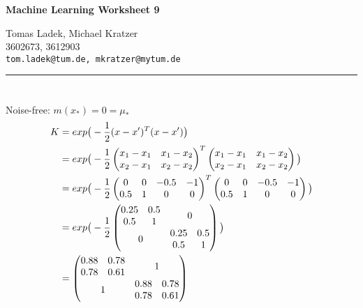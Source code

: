 \documentclass[11pt]{article}
\makeatletter
\newcommand{\exercise}{\section{}}
\newcommand{\hwhead}[4]{
\begin{center}
\sffamily\large\bfseries Machine Learning Worksheet #1
\vspace{2mm}
\normalfont

#2\\
#3\\
\texttt{#4}
\end{center}
\vspace{6mm} \hrule \vspace{4mm}
}
\newcommand{\names}{Tomas Ladek, Michael Kratzer} %
\newcommand{\imats}{3602673, 3612903} %
\newcommand{\emails}{tom.ladek@tum.de, mkratzer@mytum.de} %
\makeatother
\begin{document}
\hwhead{9}{\names}{\imats}{\emails}


\exercise
Noise-free: $m(x_*) = 0 = \mu_*$
\begin{align*}
	K &= exp\big(-\dfrac{1}{2}(x - x')^T (x - x')\big)\\	
	  &= exp\big(-\dfrac{1}{2}
	  \begin{pmatrix}
		  x_1 - x_1 & x_1 - x_2 \\
		  x_2 - x_1 & x_2 - x_2
	  \end{pmatrix}^T 
	  \begin{pmatrix}
		  x_1 - x_1 & x_1 - x_2 \\
		  x_2 - x_1 & x_2 - x_2
	  \end{pmatrix}
	  \big)\\	  
	  &= exp\big(-\dfrac{1}{2}
	  \begin{pmatrix}
		  0 & 0 & -0.5 & -1 \\
		  0.5 & 1 & 0 & 0
	  \end{pmatrix}^T 
	  \begin{pmatrix}
		  0 & 0 & -0.5 & -1 \\
		  0.5 & 1 & 0 & 0
	  \end{pmatrix}
	  \big)\\	  
	  &= exp\big(-\dfrac{1}{2}
	  \begin{pmatrix}
		  0.25 & 0.5 &  &  \\
		  0.5 & 1 & \multicolumn{2}{c}{\smash{\raisebox{.5\normalbaselineskip}{0}}} \\
		  & & 0.25 & 0.5 \\
		  \multicolumn{2}{c}{\smash{\raisebox{.5\normalbaselineskip}{0}}} & 0.5 & 1
	  \end{pmatrix}
	  \big)\\	  
	  &=
	  \begin{pmatrix}
		  0.88 & 0.78 &  &  \\
		  0.78 & 0.61 & \multicolumn{2}{c}{\smash{\raisebox{0.5\normalbaselineskip}{1}}} \\
		  & & 0.88 & 0.78 \\
		  \multicolumn{2}{c}{\smash{\raisebox{.5\normalbaselineskip}{1}}} & 0.78 & 0.61
	  \end{pmatrix}
\end{align*}
\end{document}
